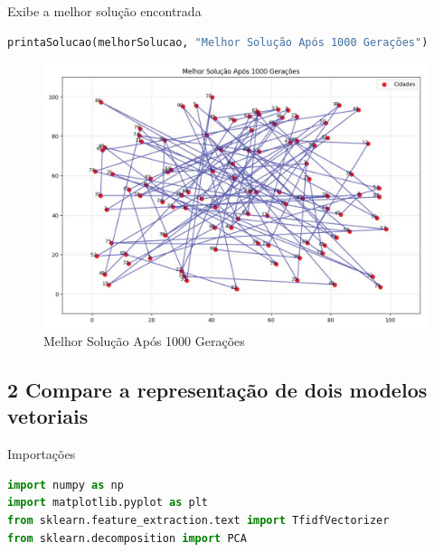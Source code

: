 Exibe a melhor solução encontrada

\begin{lstlisting}[language=Python, style=input]
printaSolucao(melhorSolucao, "Melhor Solução Após 1000 Gerações")
\end{lstlisting}

\begin{figure}[H]
\centering
\includegraphics[width=1\linewidth]{apendices/fig/IAA015_2.png}
\caption{Melhor Solução Após 1000 Gerações}
\end{figure}

\subsection*{\textbf{2 Compare a representação de dois modelos vetoriais}}

Importações

\begin{lstlisting}[language=Python, style=input]
import numpy as np
import matplotlib.pyplot as plt
from sklearn.feature_extraction.text import TfidfVectorizer
from sklearn.decomposition import PCA
\end{lstlisting}

